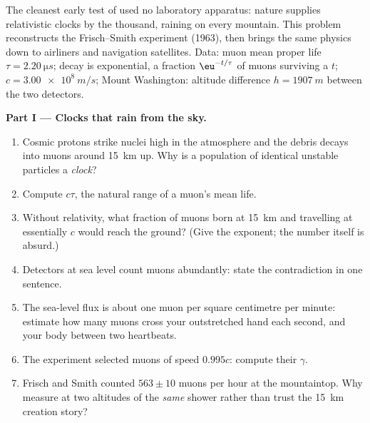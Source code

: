\begin{problem}\label{pb:b3:relativistic-kinematics:1}
The cleanest early test of  used no laboratory
apparatus: nature supplies relativistic clocks by the thousand, raining
on every mountain. This problem reconstructs the Frisch--Smith
experiment (1963), then brings the same physics down to airliners and
navigation satellites. Data: muon mean proper life $\tau =
\qty{2.20}{\micro s}$; decay is exponential, a fraction
$\eu^{-t/\tau}$ of muons surviving a  $t$; $c =
\qty{3.00e8}{m/s}$; Mount Washington: altitude difference $h =
\qty{1907}{m}$ between the two detectors.

\medskip\noindent\textbf{Part I --- Clocks that rain from the sky.}
\begin{enumerate}
  \item Cosmic protons strike nuclei high in the atmosphere and the
        debris decays into muons around \qty{15}{km} up. Why is a
        population of identical unstable particles a \emph{clock}?
  \item Compute $c\tau$, the natural range of a muon's mean life.
  \item Without relativity, what fraction of muons born at
        \qty{15}{km} and travelling at essentially $c$ would reach
        the ground? (Give the exponent; the number itself is
        absurd.)
  \item Detectors at sea level count muons abundantly: state the
        contradiction in one sentence.
  \item The sea-level flux is about one muon per square centimetre
        per minute: estimate how many muons cross your outstretched
        hand each second, and your body between two heartbeats.
  \item The experiment selected muons of speed $0.995c$: compute
        their $\gamma$.
  \item Frisch and Smith counted $563 \pm 10$ muons per hour at the
        mountaintop. Why measure at two altitudes of the \emph{same}
        shower rather than trust the \qty{15}{km} creation story?
\end{enumerate}


\end{problem}

